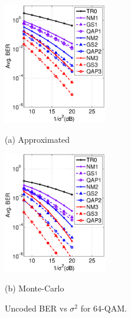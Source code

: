 \documentclass[journal]{IEEEtran}
\begin{document}
\begin{figure}[htb]
  \begin{minipage}[b]{.48\linewidth}
    \centering
    \centerline{\includegraphics[width=4.5cm]{./figs/BER_noise_power_approx_64QAM.eps}}
    \centerline{(a) Approximated}\medskip
  \end{minipage}
  \hfill
  \begin{minipage}[b]{0.48\linewidth}
    \centering
    \centerline{\includegraphics[width=4.5cm]{./figs/BER_noise_power_MonteCarlo_64QAM.eps}}
    \centerline{(b) Monte-Carlo}\medskip
  \end{minipage}
  \caption{Uncoded BER vs $\sigma^2$ for 64-QAM.}
  \label{fig:uncoded_noisepower}
\end{figure}
\end{document}
